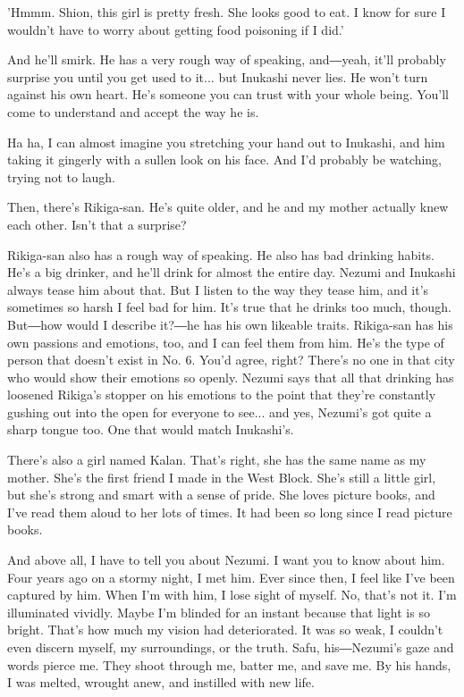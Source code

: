 'Hmmm. Shion, this girl is pretty fresh. She looks good to eat. I know
for sure I wouldn't have to worry about getting food poisoning if I
did.'

And he'll smirk. He has a very rough way of speaking, and―yeah, it'll
probably surprise you until you get used to it... but Inukashi never
lies. He won't turn against his own heart. He's someone you can trust
with your whole being. You'll come to understand and accept the way he
is.

Ha ha, I can almost imagine you stretching your hand out to Inukashi,
and him taking it gingerly with a sullen look on his face. And I'd
probably be watching, trying not to laugh.

Then, there's Rikiga-san. He's quite older, and he and my mother
actually knew each other. Isn't that a surprise?

Rikiga-san also has a rough way of speaking. He also has bad drinking
habits. He's a big drinker, and he'll drink for almost the entire day.
Nezumi and Inukashi always tease him about that. But I listen to the way
they tease him, and it's sometimes so harsh I feel bad for him. It's
true that he drinks too much, though. But―how would I describe it?―he
has his own likeable traits. Rikiga-san has his own passions and
emotions, too, and I can feel them from him. He's the type of person
that doesn't exist in No. 6. You'd agree, right? There's no one in that
city who would show their emotions so openly. Nezumi says that all that
drinking has loosened Rikiga's stopper on his emotions to the point that
they're constantly gushing out into the open for everyone to see... and
yes, Nezumi's got quite a sharp tongue too. One that would match
Inukashi's.

There's also a girl named Kalan. That's right, she has the same name as
my mother. She's the first friend I made in the West Block. She's still
a little girl, but she's strong and smart with a sense of pride. She
loves picture books, and I've read them aloud to her lots of times. It
had been so long since I read picture books.

And above all, I have to tell you about Nezumi. I want you to know about
him. Four years ago on a stormy night, I met him. Ever since then, I
feel like I've been captured by him. When I'm with him, I lose sight of
myself. No, that's not it. I'm illuminated vividly. Maybe I'm blinded
for an instant because that light is so bright. That's how much my
vision had deteriorated. It was so weak, I couldn't even discern myself,
my surroundings, or the truth. Safu, his―Nezumi's gaze and words pierce
me. They shoot through me, batter me, and save me. By his hands, I was
melted, wrought anew, and instilled with new life.

